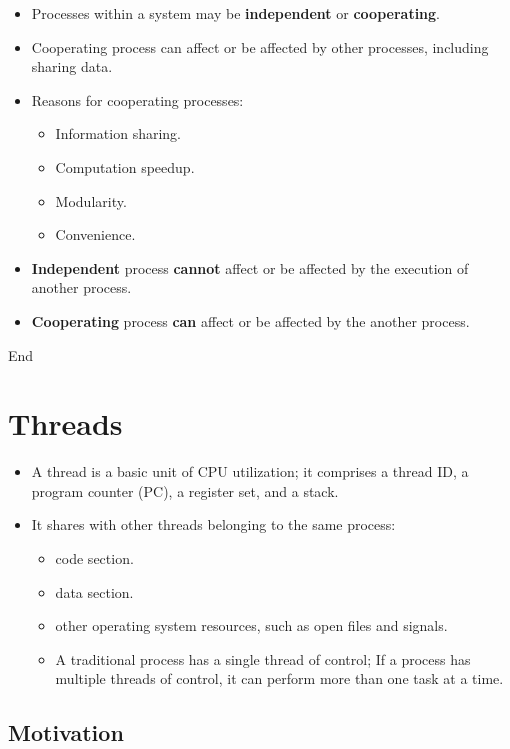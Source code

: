 \documentclass[10pt]{article}
\newcommand{\tf}{\textbf}
\begin{document}
\begin{itemize}
	\item Processes within a system may be \tf{independent} or \tf{cooperating}.
	\item Cooperating process can affect or be affected by other processes, including sharing data.
	\item Reasons for cooperating processes: 
	\begin{itemize}
		\item Information sharing.
		\item Computation speedup.
		\item Modularity.
		\item Convenience.
	\end{itemize}

	\item \tf{Independent} process \tf{cannot} affect or be affected by the execution of another process.
	\item \tf{Cooperating} process \tf{can} affect or be affected by the another process.
\end{itemize}

\begin{center}
	End
\end{center}

\newpage
\section{Threads}

\begin{itemize}
	\item A thread is a basic unit of CPU utilization; it comprises a thread ID, a program counter (PC), a register set, and a stack.
	\item It shares with other threads belonging to the same process:
	\begin{itemize}
		\item code section.
		\item data section.
		\item other operating system resources, such as open files and signals.
		\item A traditional process has a single thread of control; If a process has multiple threads of control, it can perform more than one task at a time.
	\end{itemize}
\end{itemize}

\subsection{Motivation}
\end{document}
